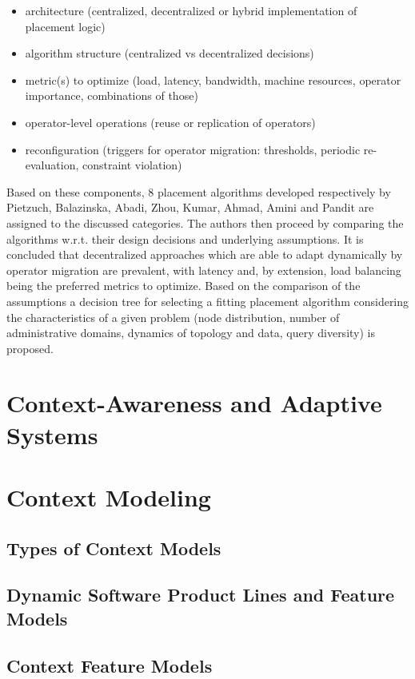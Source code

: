 \begin{itemize}
\item architecture (centralized, decentralized or hybrid implementation of placement logic)
\item algorithm structure (centralized vs decentralized decisions)
\item metric(s) to optimize (load, latency, bandwidth, machine resources, operator importance, combinations of those)
\item operator-level operations (reuse or replication of operators) 
\item reconfiguration (triggers for operator migration: thresholds, periodic re-evaluation, constraint violation)
\end{itemize}

Based on these components, 8 placement algorithms developed respectively by Pietzuch, Balazinska, Abadi, Zhou, Kumar, Ahmad, Amini and Pandit are assigned to the discussed categories. The authors then proceed by comparing the algorithms w.r.t. their design decisions and underlying assumptions. It is concluded that decentralized approaches which are able to adapt dynamically by operator migration are prevalent, with latency and, by extension, load balancing being the preferred metrics to optimize. 
Based on the comparison of the assumptions a decision tree for selecting a fitting placement algorithm considering the characteristics of a given problem (node distribution, number of administrative domains, dynamics of topology and data, query diversity) is proposed.



\section{Context-Awareness and Adaptive Systems}

\section{Context Modeling}
\subsection{Types of Context Models}
\subsection{Dynamic Software Product Lines and Feature Models}
\subsection{Context Feature Models}

